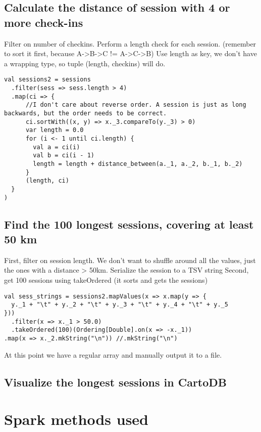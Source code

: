 \documentclass[abstract=on]{article}
\begin{document}
\subsection{Calculate the distance of session with 4 or more check-ins}
Filter on number of checkins.
Perform a length check for each session. (remember to sort it first, because A->B->C != A->C->B)
Use length as key, we don't have a wrapping type, so tuple (length, checkins) will do.
\begin{lstlisting}
val sessions2 = sessions
  .filter(sess => sess.length > 4)
  .map(ci => {
      //I don't care about reverse order. A session is just as long backwards, but the order needs to be correct.
      ci.sortWith((x, y) => x._3.compareTo(y._3) > 0)
      var length = 0.0
      for (i <- 1 until ci.length) {
        val a = ci(i)
        val b = ci(i - 1)
        length = length + distance_between(a._1, a._2, b._1, b._2)
      }
      (length, ci)
  }
)
\end{lstlisting}

\subsection{Find the 100 longest sessions, covering at least 50 km}
First, filter on session length. We don't want to shuffle around all the values, just the ones with a distance > 50km.
Serialize the session to a TSV string
Second, get 100 sessions using takeOrdered (it sorts and gets the sessions)
\begin{lstlisting}
val sess_strings = sessions2.mapValues(x => x.map(y => {
  y._1 + "\t" + y._2 + "\t" + y._3 + "\t" + y._4 + "\t" + y._5
}))
  .filter(x => x._1 > 50.0)
  .takeOrdered(100)(Ordering[Double].on(x => -x._1))
.map(x => x._2.mkString("\n")) //.mkString("\n")
\end{lstlisting}
At this point we have a regular array and manually output it to a file.


\subsection{Visualize the longest sessions in CartoDB}


\section{Spark methods used}
\end{document}
